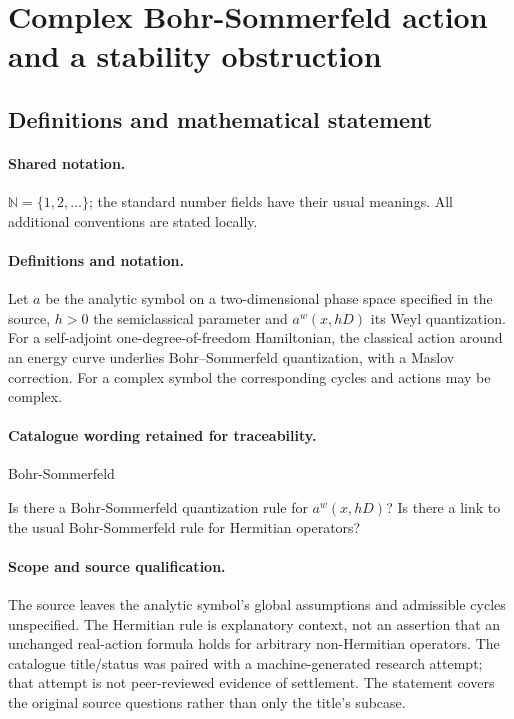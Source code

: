 \documentclass[11pt]{article}
\begin{document}
\section{Complex Bohr-Sommerfeld action and a stability obstruction}\label{statement}

\subsection{Definitions and mathematical statement}

\paragraph{Shared notation.}$\mathbb N=\{1,2,\ldots\}$; the standard number fields have their usual meanings. All additional conventions are stated locally.


\paragraph{Definitions and notation.}Let $a$ be the analytic symbol on a two-dimensional phase space specified in the source, $h>0$ the semiclassical parameter and $a^w(x,hD)$ its Weyl quantization. For a self-adjoint one-degree-of-freedom Hamiltonian, the classical action around an energy curve underlies Bohr--Sommerfeld quantization, with a Maslov correction. For a complex symbol the corresponding cycles and actions may be complex.

\paragraph{Catalogue wording retained for traceability.}
Bohr-Sommerfeld

Is there a Bohr-Sommerfeld quantization rule for $a^w(x,hD)$? Is there a link to the usual Bohr-Sommerfeld rule for Hermitian operators?
\paragraph{Scope and source qualification.}The source leaves the analytic symbol’s global assumptions and admissible cycles unspecified. The Hermitian rule is explanatory context, not an assertion that an unchanged real-action formula holds for arbitrary non-Hermitian operators. The catalogue title/status was paired with a machine-generated research attempt; that attempt is not peer-reviewed evidence of settlement. The statement covers the original source questions rather than only the title’s subcase.
\end{document}
